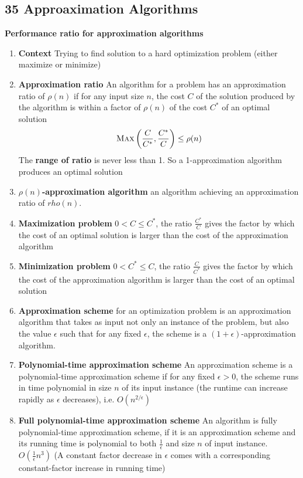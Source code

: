 \documentclass[11pt]{article}
\begin{document}
\subsection*{35 Approaximation Algorithms}


\begin{defn*}
    \textbf{Performance ratio for approximation algorithms}
    \begin{enumerate}
        \item \textbf{Context} Trying to find solution to a hard optimization problem (either maximize or minimize)
        \item \textbf{Approximation ratio} An algorithm for a problem has an approximation ratio of $\rho(n)$ if for any input size $n$, the cost $C$ of the solution produced by the algorithm is within a factor of $\rho(n)$ of the cost $C^*$ of an optimal solution 
        \[
            \textsc{Max}\left( \frac{C}{C^*}, \frac{C^*}{C} \right) \leq \rho(n)
        \]
        The \textbf{range of ratio} is never less than 1. So a 1-approximation algorithm produces an optimal solution
        \item \textbf{$\rho(n)$-approximation algorithm} an algorithm achieving an approximation ratio of $rho(n)$. 
        \item \textbf{Maximization problem} $0 < C \leq C^*$, the ratio $\frac{C^*}{C}$ gives the factor by which the cost of an optimal solution is larger than the cost of the approximation algorithm
        \item \textbf{Minimization problem} $0 < C^* \leq C$, the ratio $\frac{C}{C^*}$ gives the factor by which the cost of the approximation algorithm is larger than the cost of an optimal solution 
        \item \textbf{Approximation scheme} for an optimization problem is an approximation algorithm that takes as input not only an instance of the problem, but also the value $\epsilon$ such that for any fixed $\epsilon$, the scheme is a $(1+\epsilon)$-approximation algorithm. 
        \item \textbf{Polynomial-time approximation scheme} An approximation scheme is a polynomial-time approximation scheme if for any fixed $\epsilon > 0$, the scheme runs in time polynomial in size $n$ of its input instance (the runtime can increase rapidly as $\epsilon$ decreases), i.e. $O(n^{2/\epsilon})$
        \item \textbf{Full polynomial-time approximation scheme} An algorithm is fully polynomial-time approximation scheme, if it is an approximation scheme and its running time is polynomial to both $\frac{1}{\epsilon}$ and size $n$ of input instance. $O(\frac{1}{\epsilon}n^3)$ (A constant factor decrease in $\epsilon$ comes with a corresponding constant-factor increase in running time)
    \end{enumerate}
\end{defn*}
\end{document}
